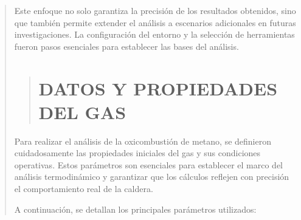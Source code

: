 \documentclass[11pt, a4paper]{article}
\begin{document}
\begin{quote}
\begin{center}
\begin{adjustwidth}{-1.7cm}{-1cm}
Este enfoque no solo garantiza la precisión de los resultados obtenidos, sino que también permite extender el análisis a escenarios adicionales en futuras investigaciones. La configuración del entorno y la selección de herramientas fueron pasos esenciales para establecer las bases del análisis.




\newpage

\begin{quote}
\setlength{\parskip}{1pt} %
\vspace*{0.3cm} %
\hypertarget{datos}{%
\section{DATOS Y PROPIEDADES DEL GAS }\label{datos}}
\end{quote}
\vspace*{1cm} %


Para realizar el análisis de la oxicombustión de metano, se definieron cuidadosamente las propiedades iniciales del gas y sus condiciones operativas. Estos parámetros son esenciales para establecer el marco del análisis termodinámico y garantizar que los cálculos reflejen con precisión el comportamiento real de la caldera. 

A continuación, se detallan los principales parámetros utilizados:


\end{adjustwidth}
\end{center}
\end{quote}
\end{document}
